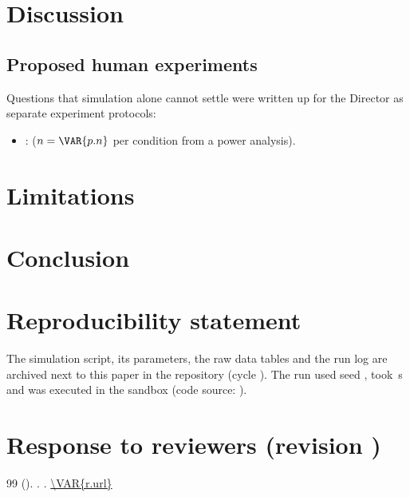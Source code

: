 \documentclass[11pt,a4paper]{article}
\begin{document}
\section{Discussion}

\subsection*{Proposed human experiments}
Questions that simulation alone cannot settle were written up for the Director as separate experiment protocols:
\begin{itemize}
  \item \textbf{}:  ($n = \VAR{p.n}$ per condition from a power analysis).
\end{itemize}

\section{Limitations}

\section{Conclusion}

\section*{Reproducibility statement}
The simulation script, its parameters, the raw data tables and the run log are archived next to this paper in the
 repository (cycle ). The run used seed , took \,s and was
executed in the  sandbox (code source: ).

\appendix
\section{Response to reviewers (revision )}

\begin{thebibliography}{99}
  (). . \emph{}. \url{\VAR{r.url}}

\end{thebibliography}
\end{document}
